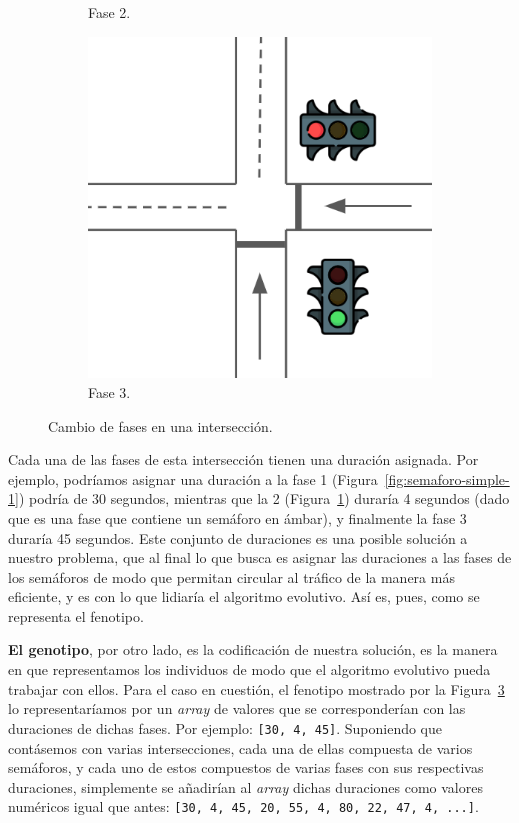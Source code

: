 \begin{figure}[ht]
\begin{subfigure}[t]{0.32\textwidth}
        \caption{Fase 2.}
        \label{fig:semaforo-simple-2}
    \end{subfigure}
    \hfill
    \begin{subfigure}[t]{0.32\textwidth}
        \centering
        \includegraphics[width=\textwidth]{report/images/semaforossimple3.png}
        \caption{Fase 3.}
        \label{fig:semaforo-simple-3}
    \end{subfigure}
    \caption{Cambio de fases en una intersección.}
    \label{fig:semaforo-simple}
\end{figure}

Cada una de las fases de esta intersección tienen una duración asignada. Por ejemplo, podríamos asignar una duración a la fase 1 (Figura~\ref{fig:semaforo-simple-1}) podría de 30 segundos, mientras que la 2 (Figura~\ref{fig:semaforo-simple-2}) duraría 4 segundos (dado que es una fase que contiene un semáforo en ámbar), y finalmente la fase 3 duraría 45 segundos. Este conjunto de duraciones es una posible solución a nuestro problema, que al final lo que busca es asignar las duraciones a las fases de los semáforos de modo que permitan circular al tráfico de la manera más eficiente, y es con lo que lidiaría el algoritmo evolutivo. Así es, pues, como se representa el fenotipo.

\textbf{El genotipo}, por otro lado, es la codificación de nuestra solución, es la manera en que representamos los individuos de modo que el algoritmo evolutivo pueda trabajar con ellos. Para el caso en cuestión, el fenotipo mostrado por la Figura~\ref{fig:semaforo-simple} lo representaríamos por un \textit{array} de valores que se corresponderían con las duraciones de dichas fases. Por ejemplo: \texttt{[30, 4, 45]}. Suponiendo que contásemos con varias intersecciones, cada una de ellas compuesta de varios semáforos, y cada uno de estos compuestos de varias fases con sus respectivas duraciones, simplemente se añadirían al \textit{array} dichas duraciones como valores numéricos igual que antes: \texttt{[30, 4, 45, 20, 55, 4, 80, 22, 47, 4, ...]}.

